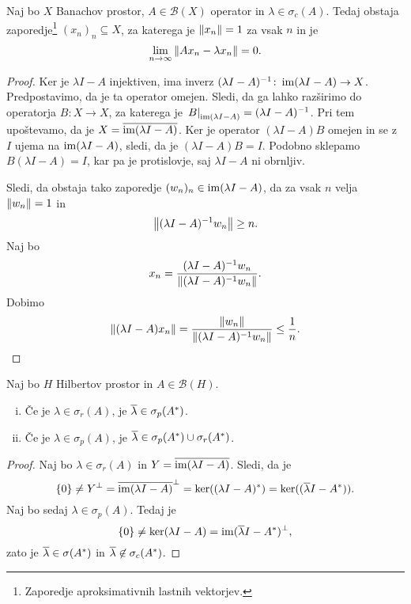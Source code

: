 
\begin{trditev}
Naj bo $X$ Banachov prostor, $A \in \mathcal{B}(X)$ operator in
$\lambda \in \sigma_c(A)$. Tedaj obstaja
zaporedje\footnote{Zaporedje aproksimativnih lastnih vektorjev.}
$(x_n)_n \subseteq X$, za katerega je $\left\lVert x_n\right\rVert = 1$ za vsak $n$
in je
\[
\lim_{n \to \infty} \left\lVert Ax_n - \lambda x_n\right\rVert = 0.
\]
\end{trditev}

\begin{proof}
Ker je $\lambda I - A$ injektiven, ima inverz
$(\lambda I - A)^{-1} \colon \operatorname{im} (\lambda I - A) \to X$.
Predpostavimo, da je ta operator omejen. Sledi, da ga lahko
razširimo do operatorja $B \colon X \to X$, za katerega je
$\left. B\right|_{\operatorname{im} (\lambda I - A)}^{} = (\lambda I - A)^{-1}$. Pri tem
upoštevamo, da je $X = \overline{\operatorname{im} (\lambda I - A)}$. Ker je
operator $(\lambda I - A)B$ omejen in se z $I$ ujema na
$\operatorname{im} (\lambda I - A)$, sledi, da je $(\lambda I - A)B = I$. Podobno
sklepamo $B(\lambda I - A) = I$, kar pa je protislovje, saj
$\lambda I - A$ ni obrnljiv.

Sledi, da obstaja tako zaporedje $(w_n)_n \in \operatorname{im} (\lambda I - A)$,
da za vsak $n$ velja $\left\lVert w_n\right\rVert = 1$ in
\[
\left\lVert (\lambda I - A)^{-1}w_n\right\rVert \geq n.
\]
Naj bo
\[
x_n =
\frac{(\lambda I - A)^{-1}w_n}{\left\lVert (\lambda I - A)^{-1}w_n\right\rVert}.
\]
Dobimo
\[
\left\lVert (\lambda I - A) x_n\right\rVert =
\frac{\left\lVert w_n\right\rVert}{\left\lVert (\lambda I - A)^{-1}w_n\right\rVert} \leq
\frac{1}{n}. \qedhere
\]
\end{proof}

\begin{trditev}
Naj bo $H$ Hilbertov prostor in $A \in \mathcal{B}(H)$.

\begin{enumerate}[i)]
\item Če je $\lambda \in \sigma_r(A)$, je
$\overline{\lambda} \in \sigma_p(A^*)$.
\item Če je $\lambda \in \sigma_p(A)$, je
$\overline{\lambda} \in \sigma_p(A^*) \cup \sigma_r(A^*)$.
\end{enumerate}
\end{trditev}

\begin{proof}
Naj bo $\lambda \in \sigma_r(A)$ in
$Y = \overline{\operatorname{im} (\lambda I - A)}$. Sledi, da je
\[
\left\{0\right\} \ne
Y^\bot =
\overline{\operatorname{im}(\lambda I - A)}^\bot =
\ker ((\lambda I - A)^*) =
\ker ((\overline{\lambda} I - A^*)).
\]
Naj bo sedaj $\lambda \in \sigma_p(A)$. Tedaj je
\[
\left\{0\right\} \ne \ker (\lambda I - A) =
\operatorname{im} (\overline{\lambda} I - A^*)^\bot,
\]
zato je $\overline{\lambda} \in \sigma(A^*)$ in
$\overline{\lambda} \not \in \sigma_c(A^*)$.
\end{proof}

